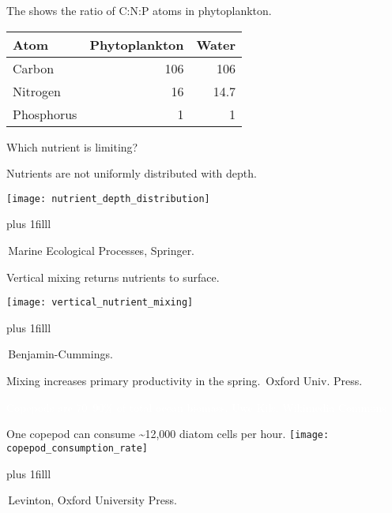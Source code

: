 \documentclass[t]{beamer}
\begin{document}
\begin{frame}[t]{The  shows the ratio of C:N:P atoms in phytoplankton.}

\begin{center}
	\begin{tabular}{@{}lrr@{}}
	\toprule
	Atom & Phytoplankton & Water \\
	\midrule
	Carbon & 106 & 106 \\
	Nitrogen & 16 & 14.7 \\
	Phosphorus & 1 & 1 \\
	\bottomrule
	\end{tabular}
\end{center}

\hangpara Which nutrient is limiting?

\end{frame}


\begin{frame}[t]{Nutrients are not uniformly distributed with depth.}

	\texttt{[image: nutrient\_depth\_distribution]}

\vskip0pt plus 1filll

\tiny\textcopyright\,Marine Ecological Processes, Springer.
\end{frame}

\begin{frame}[t]{Vertical mixing returns nutrients to surface.}

	\texttt{[image: vertical\_nutrient\_mixing]}

\vskip0pt plus 1filll

\tiny\textcopyright\,Benjamin-Cummings.
\end{frame}

{
\begin{frame}[b]{Mixing increases primary productivity in the spring.}
\tiny\hfill\textcopyright\,Oxford Univ. Press.
\end{frame}
}

{
\begin{frame}[b]{\textcolor{white}{Copepods are 70–90\% of total ocean biomass.}}
\tiny\textcolor{white}{Uwe Kils, Wikimedia Commons}
\end{frame}
}

\begin{frame}[t]{One copepod can consume \textasciitilde12,000 diatom cells per hour.}
	\vspace*{\baselineskip}
	\texttt{[image: copepod\_consumption\_rate]}
	
	\vskip0pt plus 1filll
	
	\tiny\textcopyright\,Levinton, Oxford University Press.
\end{frame}
\end{document}
